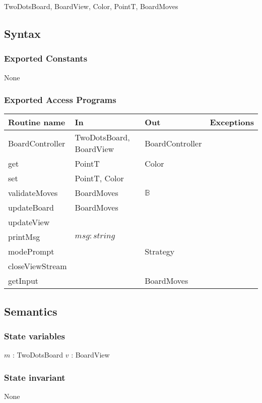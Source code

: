\documentclass[12pt]{article}
\begin{document}
TwoDotsBoard, BoardView, Color, PointT, BoardMoves

\subsection* {Syntax}

\subsubsection* {Exported Constants}

None

\subsubsection* {Exported Access Programs}

\begin{tabular}{| l | l | l | p{6cm} |}
\hline
\textbf{Routine name} & \textbf{In} & \textbf{Out} & \textbf{Exceptions}\\
\hline
BoardController & TwoDotsBoard, BoardView & BoardController& \\
\hline
get & PointT & Color & \\
\hline
set & PointT, Color &  & \\
\hline
validateMoves & BoardMoves & $\mathbb{B}$ & \\
\hline
updateBoard & BoardMoves &  & \\
\hline
updateView &   &  & \\
\hline
printMsg & $msg : string$ &  & \\
\hline
modePrompt &  & Strategy & \\
\hline
closeViewStream &  &  & \\
\hline
getInput &  & BoardMoves & \\
\hline

\end{tabular}

\subsection* {Semantics}


\subsubsection* {State variables}
\noindent $m$ : TwoDotsBoard
\noindent $v$ : BoardView



\subsubsection*{State invariant}
\noindent None
\end{document}
